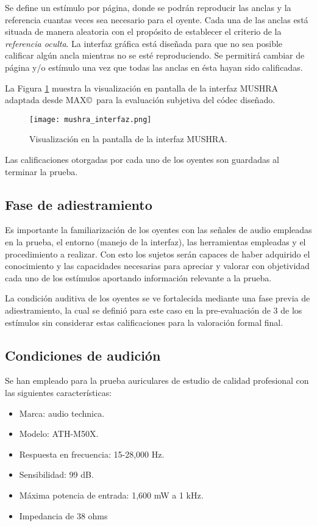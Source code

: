 Se define un estímulo por página, donde se podrán reproducir las anclas y la referencia cuantas veces sea necesario para el oyente. Cada una de las anclas está situada de manera aleatoria con el propósito de establecer el criterio de la \emph{referencia oculta}. La interfaz gráfica está diseñada para que no sea posible calificar algún ancla mientras no se esté reproduciendo. Se permitirá cambiar de página y/o estímulo una vez que todas las anclas en ésta hayan sido calificadas.

La Figura \ref{mushra} muestra la visualización en pantalla de la interfaz MUSHRA adaptada desde MAX\copyright~para la evaluación subjetiva del códec diseñado.
\begin{figure}[h!]
  \centering
  \texttt{[image: mushra\_interfaz.png]}
  \caption{Visualización en la pantalla de la interfaz MUSHRA.}
  \label{mushra}
\end{figure}

Las calificaciones otorgadas por cada uno de los oyentes son guardadas al terminar la prueba.

\subsection{Fase de adiestramiento}

Es importante la familiarización de los oyentes con las señales de audio empleadas en la prueba, el entorno (manejo de la interfaz), las herramientas empleadas y el procedimiento a realizar. Con esto los sujetos serán capaces de haber adquirido el conocimiento y las capacidades necesarias para apreciar y valorar con objetividad cada uno de los estímulos aportando información relevante a la prueba. 

La condición auditiva de los oyentes se ve fortalecida mediante una fase previa de adiestramiento, la cual se definió para este caso en la pre-evaluación de 3 de los estímulos sin considerar estas calificaciones para la valoración formal final. 

\subsection{Condiciones de audición}
Se han empleado para la prueba auriculares de estudio de calidad profesional con las siguientes características:
\begin{itemize}
	\item Marca: audio technica.
	\item Modelo: ATH-M50X.
	\item Respuesta en frecuencia: 15-28,000 Hz.
	\item Sensibilidad: 99 dB.
	\item Máxima potencia de entrada: 1,600 mW a 1 kHz.
	\item Impedancia de 38 ohms
\end{itemize}

